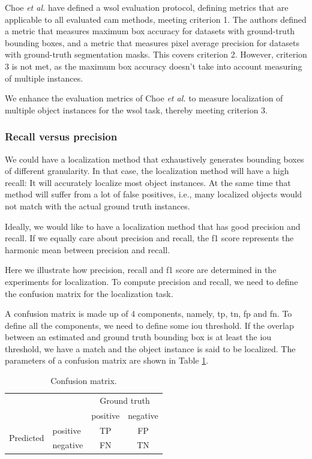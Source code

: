 Choe \textit{et al.} \cite{choe2020evaluating} have defined a \acrshort{wsol} evaluation protocol, defining metrics that are applicable to all evaluated \acrshort{cam} methods, meeting criterion 1. The authors defined a metric that measures maximum box accuracy for datasets with ground-truth bounding boxes, and a metric that measures pixel average precision for datasets with ground-truth segmentation masks. This covers criterion 2. However, criterion 3 is not met, as the maximum box accuracy doesn't take into account measuring of multiple instances.

We enhance the evaluation metrics of Choe \textit{et al.} to measure localization of multiple object instances for the \acrshort{wsol} task, thereby meeting criterion 3.

\subsubsection{Recall versus precision}
We could have a localization method that exhaustively generates bounding boxes of different granularity. In that case, the localization method will have a high recall: It will accurately localize most object instances. At the same time that method will suffer from a lot of false positives, i.e., many localized objects would not match with the actual ground truth instances. 

Ideally, we would like to have a localization method that has good precision and recall. If we equally care about precision and recall, the f1 score represents the harmonic mean between precision and recall. 

Here we illustrate how precision, recall and f1 score are determined in the experiments for localization. To compute precision and recall, we need to define the confusion matrix for the localization task. 

A confusion matrix is made up of 4 components, namely, \acrfull{tp}, \acrfull{tn}, \acrfull{fp} and \acrfull{fn}. To define all the components, we need to define some \acrshort{iou} threshold. If the overlap between an estimated and ground truth bounding box is at least the \acrshort{iou} threshold, we have a match and the object instance is said to be localized. The parameters of a confusion matrix are shown in Table \ref{tab:confusion_matrix}.
\begin{table}[ht]
\centering
\begin{tabular}{l|l|c|c|}
\multicolumn{2}{c}{} & \multicolumn{2}{c}{Ground truth} \\
\cline{3-4}
\multicolumn{2}{c|}{} & positive & negative \\
\cline{2-4}
\multirow{2}{*}{Predicted} & positive & TP & FP \\
\cline{2-4}
                           & negative & FN & TN \\
\cline{2-4}
\end{tabular}
\caption[Confusion matrix]{Confusion matrix.}
\label{tab:confusion_matrix}
\end{table}

